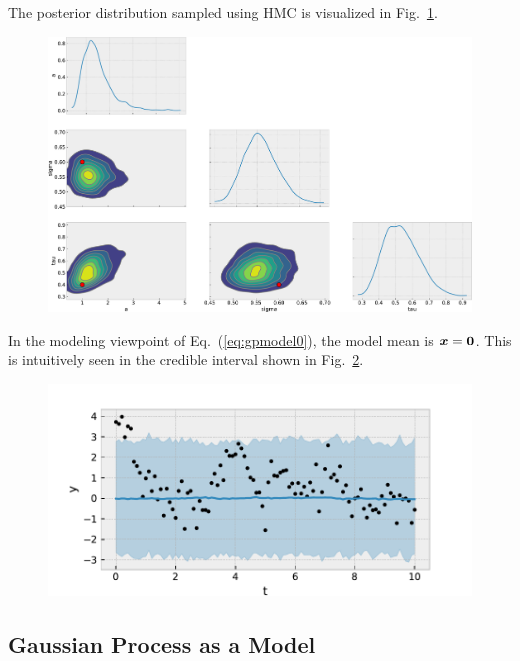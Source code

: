 The posterior distribution sampled using HMC is visualized in Fig.~\ref{fig:gp2}.
\begin{figure}[htb]
\begin{center}
\includegraphics[width=\linewidth]{fig/gp/gp2.pdf}
\caption{\label{fig:gp2}}
\end{center}
\end{figure}
In the modeling viewpoint of Eq.~(\ref{eq:gpmodel0}), the model mean is $\boldsymbol{x}=\boldsymbol{0}$. This is intuitively seen in the credible interval shown in Fig.~\ref{fig:gp3}.
\begin{figure}[htb]
\begin{center}
\includegraphics[width=\linewidth]{fig/gp/gp3.pdf}
\caption{\label{fig:gp3}}
\end{center}
\end{figure}

\subsection*{Gaussian Process as a Model}

